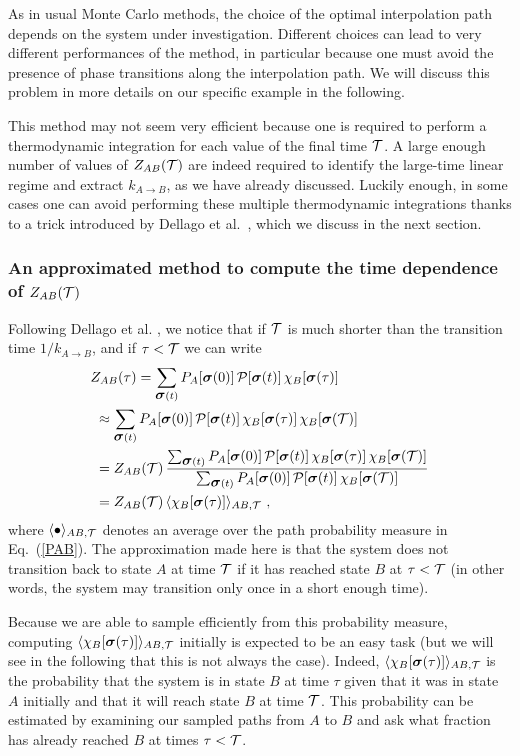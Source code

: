\documentclass[aps,twocolumn,floats,pre,amsmath,superscriptaddress]{revtex4}
\newcommand{\beq}{\begin{equation}}
\newcommand{\eeq}{\end{equation}}
\def\PP{{\cal P}}\def\EE{{\cal E}}\def\MM{{\cal M}} \def\VV{{\cal V}}
\def\TT{{\cal T}}\def\NN{{\cal N}} \def\BB{{\cal B}}\def\II{{\cal I}}
\def\to{\rightarrow} \def\la{\langle} \def\ra{\rangle}
\newcommand{\<}{\langle}
\renewcommand{\>}{\rangle}
\newcommand{\bs}{ \mbox{\boldmath$\sigma$}}
\begin{document}
As in usual Monte Carlo methods, the choice of the optimal interpolation path depends on the system
under investigation. Different choices can lead to very different performances of the method, in particular 
because one must avoid the presence of phase transitions along the interpolation path. We will discuss
this problem in more details on our specific example in the following. 

This method may not seem very efficient because one is required to perform a thermodynamic
integration for each value of the final time $\TT$. A large enough number of values of $Z_{AB}(\TT)$ are indeed required
to identify the large-time linear regime and extract $k_{A\to B}$, as
we have already discussed. Luckily enough, in some cases
one can avoid performing these multiple thermodynamic integrations thanks to a trick introduced by
Dellago et al.~\cite{chandler}, which we discuss in the next section.


\subsubsection{An approximated method to compute the time dependence of $Z_{AB}(\TT)$}
\label{sec:fullZt}

Following Dellago et al.  \cite{chandler}, we notice that if $\TT$ is much shorter than the transition time $1/k_{A\to B}$, and if $\t < \TT$ we can write
\beq\begin{split}
&Z_{AB}(\t)  = \sum_{\bs(t)} P_A[\bs(0)] \, \PP[\bs(t)] \, \chi_B[\bs(\t)]  \\
&\ \approx \sum_{\bs(t)} P_A[\bs(0)] \, \PP[\bs(t)] \, \chi_B[\bs(\t)] \, \chi_B[\bs(\TT)] \\
&\  = Z_{AB}(\TT) \, \frac{\sum_{\bs(t)} P_A[\bs(0)] \, \PP[\bs(t)] \, \chi_B[\bs(\t)] \, \chi_B[\bs(\TT)]}{\sum_{\bs(t)} P_A[\bs(0)] \, \PP[\bs(t)] \, \chi_B[\bs(\TT)]} \\
&\  = Z_{AB}(\TT) \, \la  \chi_B[\bs(\t)]  \ra_{AB,\TT} \ ,\label{smallertime}
\end{split}\eeq
where $\la\bullet\ra_{AB,\TT}$ denotes an average over the path probability
measure in Eq.~(\ref{PAB}). The approximation made here is that the system
does not transition
back to state $A$ at time $\TT$ if it has reached state $B$ at
$\tau<\TT$ (in other words, the system may transition only once in a short enough time).

Because we are able to sample efficiently from this probability measure,
computing $ \la  \chi_B[\bs(\t)]  \ra_{AB,\TT} $  initially is expected to be 
an easy task (but we will see in the following that this is not always the case). 
Indeed, $ \la  \chi_B[\bs(\t)]  \ra_{AB,\TT} $  is the probability that
the system is in state $B$ at time $\tau$ given that it was in state
$A$ initially and that it will reach state $B$ at time $\TT$. This
probability can be estimated by examining our sampled paths from $A$
to $B$ and ask what fraction has already reached $B$ at times
$\tau<\TT$.
\end{document}
